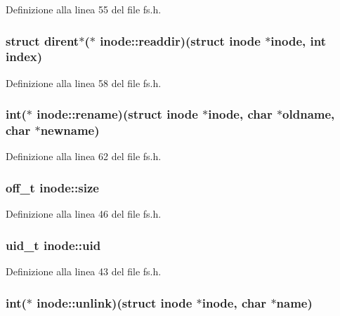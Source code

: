 Definizione alla linea 55 del file fs.\+h.

\hypertarget{structinode_a0a54c11571f19f23322f3e6ad3ecb113}{
\subsubsection[{readdir}]{\setlength{\rightskip}{0pt plus 5cm}struct {\bf dirent}$\ast$($\ast$ inode\+::readdir)(struct {\bf inode} $\ast${\bf inode}, int index)}}\label{structinode_a0a54c11571f19f23322f3e6ad3ecb113}


Definizione alla linea 58 del file fs.\+h.

\hypertarget{structinode_a5a309a9c4ada7e4d062162b06125a929}{
\subsubsection[{rename}]{\setlength{\rightskip}{0pt plus 5cm}int($\ast$ inode\+::rename)(struct {\bf inode} $\ast${\bf inode}, char $\ast$oldname, char $\ast$newname)}}\label{structinode_a5a309a9c4ada7e4d062162b06125a929}


Definizione alla linea 62 del file fs.\+h.

\hypertarget{structinode_a53722b1b60b7136ce0204b66527bb400}{
\subsubsection[{size}]{\setlength{\rightskip}{0pt plus 5cm}off\+\_\+t inode\+::size}}\label{structinode_a53722b1b60b7136ce0204b66527bb400}


Definizione alla linea 46 del file fs.\+h.

\hypertarget{structinode_a0eac94e96ded19029e871d5cce815bcb}{
\subsubsection[{uid}]{\setlength{\rightskip}{0pt plus 5cm}uid\+\_\+t inode\+::uid}}\label{structinode_a0eac94e96ded19029e871d5cce815bcb}


Definizione alla linea 43 del file fs.\+h.

\hypertarget{structinode_adf65bac80736631b8000d3d34e953aaa}{
\subsubsection[{unlink}]{\setlength{\rightskip}{0pt plus 5cm}int($\ast$ inode\+::unlink)(struct {\bf inode} $\ast${\bf inode}, char $\ast${\bf name})}}\label{structinode_adf65bac80736631b8000d3d34e953aaa}



